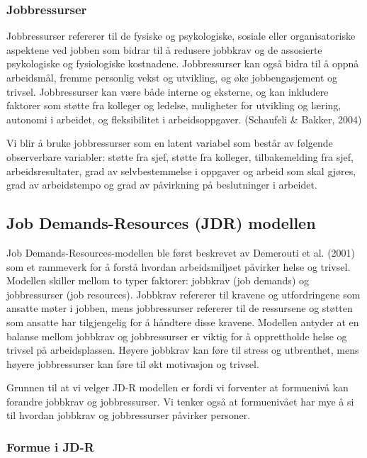 \documentclass[
  12pt,
  a4paper,
  DIV=11,
  numbers=noendperiod]{scrartcl}
\begin{document}
\subsubsection{Jobbressurser}\label{jobbressurser}

Jobbressurser refererer til de fysiske og psykologiske, sosiale eller
organisatoriske aspektene ved jobben som bidrar til å redusere jobbkrav
og de assosierte psykologiske og fysiologiske kostnadene. Jobbressurser
kan også bidra til å oppnå arbeidsmål, fremme personlig vekst og
utvikling, og øke jobbengasjement og trivsel. Jobbressurser kan være
både interne og eksterne, og kan inkludere faktorer som støtte fra
kolleger og ledelse, muligheter for utvikling og læring, autonomi i
arbeidet, og fleksibilitet i arbeidsoppgaver. (Schaufeli \& Bakker,
2004)

Vi blir å bruke jobbressurser som en latent variabel som består av
følgende observerbare variabler: støtte fra sjef, støtte fra kolleger,
tilbakemelding fra sjef, arbeidsresultater, grad av selvbestemmelse i
oppgaver og arbeid som skal gjøres, grad av arbeidstempo og grad av
påvirkning på beslutninger i arbeidet.

\subsection{Job Demands-Resources (JDR)
modellen}\label{job-demands-resources-jdr-modellen}

Job Demands-Resources-modellen ble først beskrevet av Demerouti et al.
(2001) som et rammeverk for å forstå hvordan arbeidsmiljøet påvirker
helse og trivsel. Modellen skiller mellom to typer faktorer: jobbkrav
(job demands) og jobbressurser (job resources). Jobbkrav refererer til
kravene og utfordringene som ansatte møter i jobben, mens jobbressurser
refererer til de ressursene og støtten som ansatte har tilgjengelig for
å håndtere disse kravene. Modellen antyder at en balanse mellom jobbkrav
og jobbressurser er viktig for å opprettholde helse og trivsel på
arbeidsplassen. Høyere jobbkrav kan føre til stress og utbrenthet, mens
høyere jobbressurser kan føre til økt motivasjon og trivsel.

Grunnen til at vi velger JD-R modellen er fordi vi forventer at
formuenivå kan forandre jobbkrav og jobbressurser. Vi tenker også at
formuenivået har mye å si til hvordan jobbkrav og jobbressurser påvirker
personer.

\subsubsection{Formue i JD-R}\label{formue-i-jd-r}
\end{document}
